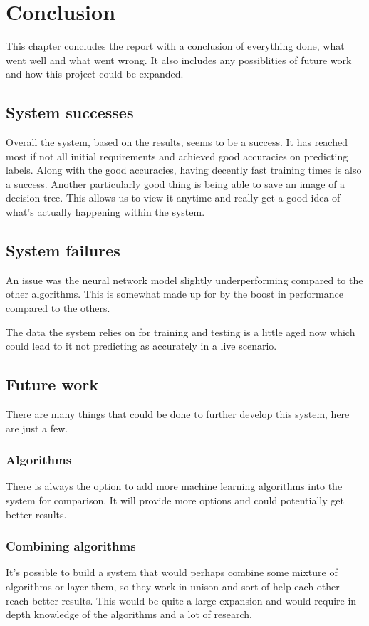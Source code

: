 

\chapter{Conclusion}

This chapter concludes the report with a conclusion of everything done, what went well and what went wrong. It also includes any possiblities of future work and how this project could be expanded.

\section{System successes}
Overall the system, based on the results, seems to be a success. It has reached most if not all initial requirements and achieved good accuracies on predicting labels. Along with the good accuracies, having decently fast training times is also a success. Another particularly good thing is being able to save an image of a decision tree. This allows us to view it anytime and really get a good idea of what's actually happening within the system.


\section{System failures}
An issue was the neural network model slightly underperforming compared to the other algorithms. This is somewhat made up for by the boost in performance compared to the others.

The data the system relies on for training and testing is a little aged now which could lead to it not predicting as accurately in a live scenario. 


\section{Future work}
There are many things that could be done to further develop this system, here are just a few.

\subsection{Algorithms}
There is always the option to add more machine learning algorithms into the system for comparison. It will provide more options and could potentially get better results.

\subsection{Combining algorithms}
It's possible to build a system that would perhaps combine some mixture of algorithms or layer them, so they work in unison and sort of help each other reach better results. This would be quite a large expansion and would require in-depth knowledge of the algorithms and a lot of research.

